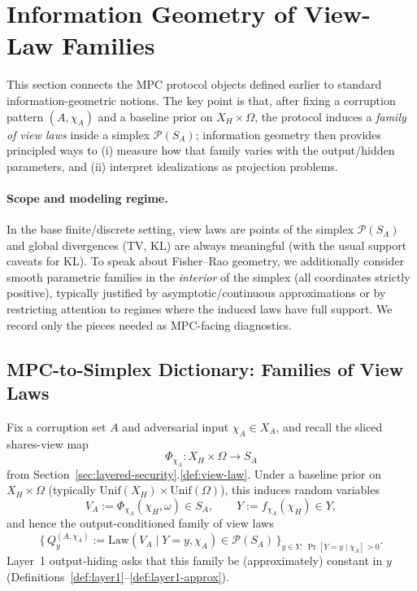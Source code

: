 \documentclass[11pt,a4paper]{article}
\theoremstyle{definition}
\theoremstyle{plain}
\newcommand{\Prob}{\mathcal{P}}
\begin{document}
\clearpage

\section{Information Geometry of View-Law Families}
\label{sec:info-geometry-view-laws}
This section connects the MPC protocol objects defined earlier to standard information-geometric notions.
The key point is that, after fixing a corruption pattern $(A,\chi_A)$ and a baseline prior on $X_H\times\Omega$, the protocol induces a \emph{family of view laws} inside a simplex $\Prob(S_A)$; information geometry then provides principled ways to (i) measure how that family varies with the output/hidden parameters, and (ii) interpret idealizations as projection problems.

\paragraph{Scope and modeling regime.}
In the base finite/discrete setting, view laws are points of the simplex $\Prob(S_A)$ and global divergences (TV, KL) are always meaningful (with the usual support caveats for KL).
To speak about Fisher--Rao geometry, we additionally consider smooth parametric families in the \emph{interior} of the simplex (all coordinates strictly positive), typically justified by asymptotic/continuous approximations or by restricting attention to regimes where the induced laws have full support.
We record only the pieces needed as MPC-facing diagnostics.

\subsection{MPC-to-Simplex Dictionary: Families of View Laws}
\label{subsec:mpc-to-simplex-dictionary}
Fix a corruption set $A$ and adversarial input $\chi_A\in X_A$, and recall the sliced shares-view map
\[
\Phi_{\chi_A}:X_H\times\Omega\to S_A
\]
from Section~\ref{sec:layered-security}.\ref{def:view-law}.
Under a baseline prior on $X_H\times\Omega$ (typically $\mathrm{Unif}(X_H)\times \mathrm{Unif}(\Omega)$), this induces random variables
\[
V_A:=\Phi_{\chi_A}(\chi_H,\omega)\in S_A,\qquad Y:=f_{\chi_A}(\chi_H)\in Y,
\]
and hence the output-conditioned family of view laws
\[
\{\,Q_{y}^{(A,\chi_A)}:=\mathrm{Law}(V_A\mid Y=y,\chi_A)\in\Prob(S_A)\,\}_{y\in Y:\ \Pr[Y=y\mid\chi_A]>0}.
\]
Layer~1 output-hiding asks that this family be (approximately) constant in $y$ (Definitions~\ref{def:layer1}--\ref{def:layer1-approx}).
\end{document}
